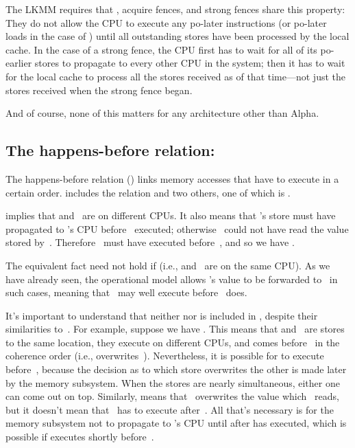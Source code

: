 The LKMM requires that , acquire fences, and strong fences
share this property:
They do not allow the CPU to execute any po-later instructions (or
po-later loads in the case of ) until all outstanding
stores have been processed by the local cache.
In the case of a strong fence, the CPU first has to wait for all of its
po-earlier stores to propagate to every other CPU in the system; then
it has to wait for the local cache to process all the stores received
as of that time---not just the stores received when the strong fence
began.

And of course, none of this matters for any architecture other than
Alpha.


\subsection{The happens-before relation: }
\label{sec:docs:explanation:The Happens-before Relation: hb}

The happens-before relation () links memory accesses that have to
execute in a certain order.
 includes the  relation and two others, one of which is .

 implies that  and~ are on different CPUs.
It also means that 's store must have propagated to 's
CPU before ~executed; otherwise ~could not have read the
value stored by~.
Therefore ~must have executed before~, and so we have
.

The equivalent fact need not hold if 
(i.e.,  and~ are on the same CPU\@).
As we have already seen, the operational model allows 's value
to be forwarded to~ in such cases, meaning that ~may well
execute before ~does.

It's important to understand that neither  nor  is included in
, despite their similarities to~.
For example, suppose we have .
This means that  and~ are stores to the same location,
they execute on different CPUs, and  comes before~ in the coherence
order (i.e.,  overwrites~).
Nevertheless, it is possible for  to execute before~,
because the decision as to which store overwrites the other is made
later by the memory subsystem.
When the stores are nearly simultaneous, either one can come out on top.
Similarly,  means that ~overwrites the value
which ~reads, but it doesn't mean that ~has to execute
after~.
All that's necessary is for the memory subsystem not to propagate 
to 's CPU until after  has executed, which is possible if
 executes shortly before~.

